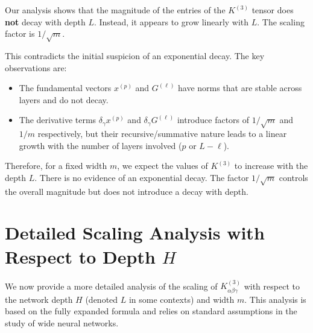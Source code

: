 \documentclass[a4paper]{article}
\begin{document}
Our analysis shows that the magnitude of the entries of the $K^{(3)}$ tensor does \textbf{not} decay with depth $L$. Instead, it appears to grow linearly with $L$. The scaling factor is $1/\sqrt{m}$.

This contradicts the initial suspicion of an exponential decay. The key observations are:
\begin{itemize}
    \item The fundamental vectors $x^{(p)}$ and $G^{(\ell)}$ have norms that are stable across layers and do not decay.
    \item The derivative terms $\delta_\gamma x^{(p)}$ and $\delta_\gamma G^{(\ell)}$ introduce factors of $1/\sqrt{m}$ and $1/m$ respectively, but their recursive/summative nature leads to a linear growth with the number of layers involved ($p$ or $L-\ell$).
\end{itemize}

Therefore, for a fixed width $m$, we expect the values of $K^{(3)}$ to increase with the depth $L$. There is no evidence of an exponential decay. The factor $1/\sqrt{m}$ controls the overall magnitude but does not introduce a decay with depth.


\newpage

\section{Detailed Scaling Analysis with Respect to Depth $H$}

We now provide a more detailed analysis of the scaling of $K^{(3)}_{\alpha\beta\gamma}$ with respect to the network depth $H$ (denoted $L$ in some contexts) and width $m$. This analysis is based on the fully expanded formula and relies on standard assumptions in the study of wide neural networks.
\end{document}
